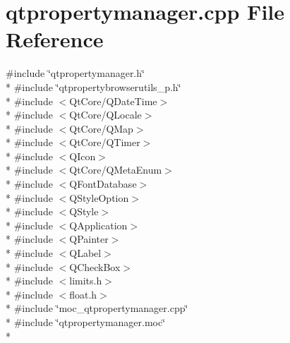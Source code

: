 \section{qtpropertymanager.\+cpp File Reference}
\label{qtpropertymanager_8cpp}
{\ttfamily \#include \char`\"{}qtpropertymanager.\+h\char`\"{}}\\*
{\ttfamily \#include \char`\"{}qtpropertybrowserutils\+\_\+p.\+h\char`\"{}}\\*
{\ttfamily \#include $<$Qt\+Core/\+Q\+Date\+Time$>$}\\*
{\ttfamily \#include $<$Qt\+Core/\+Q\+Locale$>$}\\*
{\ttfamily \#include $<$Qt\+Core/\+Q\+Map$>$}\\*
{\ttfamily \#include $<$Qt\+Core/\+Q\+Timer$>$}\\*
{\ttfamily \#include $<$Q\+Icon$>$}\\*
{\ttfamily \#include $<$Qt\+Core/\+Q\+Meta\+Enum$>$}\\*
{\ttfamily \#include $<$Q\+Font\+Database$>$}\\*
{\ttfamily \#include $<$Q\+Style\+Option$>$}\\*
{\ttfamily \#include $<$Q\+Style$>$}\\*
{\ttfamily \#include $<$Q\+Application$>$}\\*
{\ttfamily \#include $<$Q\+Painter$>$}\\*
{\ttfamily \#include $<$Q\+Label$>$}\\*
{\ttfamily \#include $<$Q\+Check\+Box$>$}\\*
{\ttfamily \#include $<$limits.\+h$>$}\\*
{\ttfamily \#include $<$float.\+h$>$}\\*
{\ttfamily \#include \char`\"{}moc\+\_\+qtpropertymanager.\+cpp\char`\"{}}\\*
{\ttfamily \#include \char`\"{}qtpropertymanager.\+moc\char`\"{}}\\*
